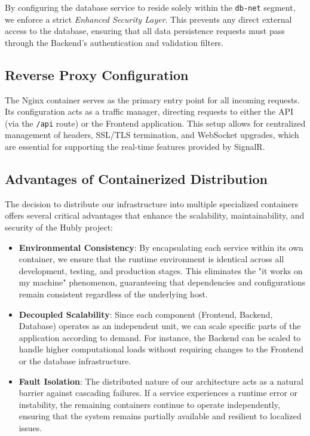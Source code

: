 By configuring the database service to reside solely within the \texttt{db-net} segment, we enforce a strict \textit{Enhanced Security Layer}. This prevents any direct external access to the database, ensuring that all data persistence requests must pass through the Backend’s authentication and validation filters.

\subsection{Reverse Proxy Configuration}
The Nginx container serves as the primary entry point for all incoming requests. Its configuration acts as a traffic manager, directing requests to either the API (via the \texttt{/api} route) or the Frontend application. This setup allows for centralized management of headers, SSL/TLS termination, and WebSocket upgrades, which are essential for supporting the real-time features provided by SignalR.

\subsection{Advantages of Containerized Distribution}

The decision to distribute our infrastructure into multiple specialized containers offers several critical advantages that enhance the scalability, maintainability, and security of the Hubly project:

\begin{itemize}
\item \textbf{Environmental Consistency}: By encapsulating each service within its own container, we ensure that the runtime environment is identical across all development, testing, and production stages. This eliminates the "it works on my machine" phenomenon, guaranteeing that dependencies and configurations remain consistent regardless of the underlying host.
\item \textbf{Decoupled Scalability}: Since each component (Frontend, Backend, Database) operates as an independent unit, we can scale specific parts of the application according to demand. For instance, the Backend can be scaled to handle higher computational loads without requiring changes to the Frontend or the database infrastructure.
\item \textbf{Fault Isolation}: The distributed nature of our architecture acts as a natural barrier against cascading failures. If a service experiences a runtime error or instability, the remaining containers continue to operate independently, ensuring that the system remains partially available and resilient to localized issues.
\end{itemize}


